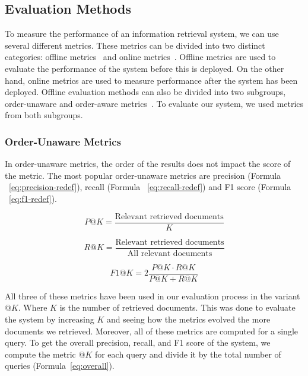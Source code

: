 \subsection{Evaluation Methods}\label{subsec:evaluation-methods}
To measure the performance of an information retrieval system, we can use several different metrics.
These metrics can be divided into two distinct categories: offline metrics~\cite{canamares_offline_2020} and online metrics~\cite{hofmann_online_2016}.
Offline metrics are used to evaluate the performance of the system before this is deployed.
On the other hand, online metrics are used to measure performance after the system has been deployed.
Offline evaluation methods can also be divided into two subgroups, order-unaware and order-aware metrics~\cite{canamares_offline_2020}.
To evaluate our system, we used metrics from both subgroups.

\subsubsection{Order-Unaware Metrics}
In order-unaware metrics, the order of the results does not impact the score of the metric.
The most popular order-unaware metrics are precision (Formula ~\ref{eq:precision-redef}), recall (Formula ~\ref{eq:recall-redef}) and F1 score (Formula ~\ref{eq:f1-redef}).

\begin{equation}
    P@K = \frac{\text{Relevant retrieved documents}}{K}
    \label{eq:precision-redef}
\end{equation}

\begin{equation}
    R@K = \frac{\text{Relevant retrieved documents}}{\text{All relevant documents}}
    \label{eq:recall-redef}
\end{equation}

\begin{equation}
    F1@K = 2 \frac{P@K \cdot R@K}{P@K + R@K}
    \label{eq:f1-redef}
\end{equation}

\noindent All three of these metrics have been used in our evaluation process in the variant $@K$.
Where $K$ is the number of retrieved documents.
This was done to evaluate the system by increasing $K$ and seeing how the metrics evolved the more documents we retrieved.
Moreover, all of these metrics are computed for a single query.
To get the overall precision, recall, and F1 score of the system, we compute the metric $@K$ for each query and divide it by the total number of queries (Formula~\ref{eq:overall}).

